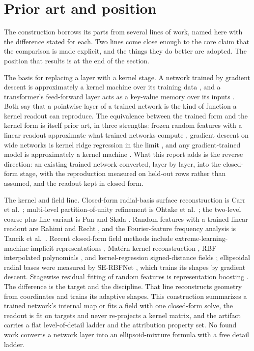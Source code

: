 \documentclass[11pt]{article}
\begin{document}
\section{Prior art and position}

The construction borrows its parts from several lines of work,
named here with the difference stated for each. Two lines come
close enough to the core claim that the comparison is made
explicit, and the things they do better are adopted. The position
that results is at the end of the section.

The basis for replacing a layer with a kernel stage. A network
trained by gradient descent is approximately a kernel machine over
its training data \cite{domingos2020}, and a transformer's
feed-forward layer acts as a key-value memory over its inputs
\cite{geva2021}. Both say that a pointwise layer of a trained
network is the kind of function a kernel readout can reproduce.
The equivalence between the trained form and the kernel form is
itself prior art, in three strengths: frozen random features with
a linear readout approximate what trained networks compute
\cite{huang2006}, gradient descent on wide networks is kernel
ridge regression in the limit \cite{jacot2018}, and any
gradient-trained model is approximately a kernel machine
\cite{domingos2020}. What this report adds is the reverse
direction: an existing trained network converted, layer by layer,
into the closed-form stage, with the reproduction measured on
held-out rows rather than assumed, and the readout kept in
closed form.

The kernel and field line. Closed-form radial-basis surface
reconstruction is Carr et al.~\cite{carr2001}; multi-level
partition-of-unity refinement is Ohtake et al.~\cite{ohtake2003};
the two-level coarse-plus-fine variant is Pan and Skala
\cite{pan2011}. Random features with a trained linear readout are
Rahimi and Recht \cite{rahimi2007}, and the Fourier-feature
frequency analysis is Tancik et al.~\cite{tancik2020}. Recent
closed-form field methods include extreme-learning-machine implicit
representations \cite{cho2026}, Mat\'ern-kernel reconstruction
\cite{weiherer2025}, RBF-interpolated polynomials \cite{zhang2025},
and kernel-regression signed-distance fields \cite{dai2026};
ellipsoidal radial bases were measured by SE-RBFNet
\cite{lian2025}, which trains its shapes by gradient descent.
Stagewise residual fitting of random features is representation
boosting \cite{zozoulenko2025}. The difference is the target and
the discipline. That line reconstructs geometry from coordinates
and trains its adaptive shapes. This construction summarizes a
trained network's internal map or fits a field with one closed-form
solve, the readout is fit on targets and never re-projects a kernel
matrix, and the artifact carries a flat level-of-detail ladder and
the attribution property set. No found work converts a network
layer into an ellipsoid-mixture formula with a free detail ladder.
\end{document}
